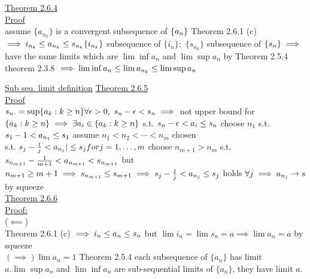 \documentclass[12pt]{amsart}
\begin{document}
\begin{enumerate}
\hdashrule[0.5ex][c]{\linewidth}{0.5pt}{1.5mm}


\underline{Theorem 2.6.4}\\
\underline{Proof}\\
assume $\{ a_{n_k} \}$ is a convergent subsequence of $\{ a_n \}\\$
Theorem 2.6.1 (c)\\
$\implies i_{n_k} \leq a_{n_k} \leq s_{n_k}\\
\{ i_{n_k} \}$ subsequence of $\{ i_n \};\,\, \{ s_{n_k} \}$ subsequence of $\{ s_n \}\\
\implies$ have the same limits which are $\lim \inf a_n$ and $\lim \sup a_n$ by Theorem 2.5.4\\
theorem 2.3.8 $\implies \lim \inf a_n \leq \lim a_{n_k} \leq \lim \sup a_n\\$


\hdashrule[0.5ex][c]{\linewidth}{0.5pt}{1.5mm}

\underline{Sub seq. limit definition}
\underline{Theorem 2.6.5}\\
\underline{Proof}\\
$s_n.= \sup \{ a_k : k \geq n \} \forall \epsilon>0,\,\, s_n - \epsilon < s_n\\
\implies$ not upper bound for $\{ a_k: k \geq n \}\\
\implies \exists a_i \in \{ a_k : k \geq n \}$ s.t. $s_n - \epsilon < a_i \leq s_n\\$
choose $n_1$ s.t. $s_1 - 1 < a_{n_1} \leq s_1\\$
assume $n_1 < n_2 < \cdots < n_m$ chosen\\
s.t. $s_j - \frac{1}{j} < a_{n_j}| \leq s_j for j= 1, \dots, m\\$
choose $n_{m+1} > n_m$ s.t. $s_{n_{m+1}} - \frac{1}{m+1} < a_{n_{m+1}} < s_{n_{m+1}}\\$
but $n_{m+1} \geq m+1 \implies s_{n_{m+1}} \leq s_{m+1}\\
\implies s_j - \frac{1}{j} < a_{n_j} \leq s_j$ holds $\forall j\\
\implies a_{n_j} \rightarrow s$ by squeeze\\


\underline{Theorem 2.6.6}\\
\underline{Proof:}\\
($\impliedby$)\\
Theorem 2.6.1 (c) $\implies i_n \leq a_n \leq s_n\\$
but $\lim i_n = \lim s_n = a \implies \lim a_n = a$ by squeeze\\
$( \implies ) \lim a_n = 1$ Theorem 2.5.4 each subsequence of $\{a_n \}$ has limit $a. \lim \sup a_n$ and $\lim \inf a_n$ are sub-sequential limits of $\{ a_n \}$, they have limit $a$.\\



\end{enumerate}
\end{document}
